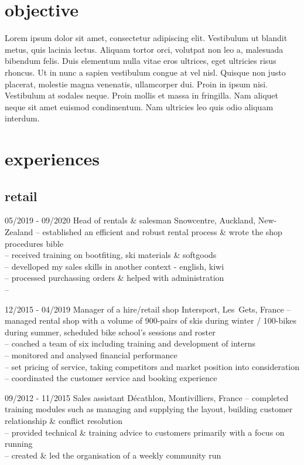 \documentclass[a4paper]{farangoth-cv}
\begin{document}
\section{objective}
Lorem ipsum dolor sit amet, consectetur adipiscing elit. Vestibulum ut blandit metus, quis lacinia lectus. Aliquam tortor orci, volutpat non leo a, malesuada bibendum felis. Duis elementum nulla vitae eros ultrices, eget ultricies risus rhoncus. Ut in nunc a sapien vestibulum congue at vel nisl. Quisque non justo placerat, molestie magna venenatis, ullamcorper dui. Proin in ipsum nisi. Vestibulum at sodales neque. Proin mollis et massa in fringilla. Nam aliquet neque sit amet euismod condimentum. Nam ultricies leo quis odio aliquam interdum.

\section{experiences}
\subsection{retail}
\begin{entrylist}
  \entry%
  {05/2019 \-- 09/2020}
  {Head of rentals \& salesman}
  {Snowcentre, \mbox{Auckland}, \mbox{New-Zealand}}
  {
    \--- established an efficient and robust rental process \& wrote the shop procedures bible\\
    \--- received training on bootfiting, ski materials \& softgoods\\
    \--- develloped my sales skills in another context \-- english, kiwi\\
    \--- processed purchassing orders \& helped with administration\\
    \--- 
  }
  
  \entry%
  {12/2015 \-- 04/2019}
  {Manager of a hire/retail shop}
  {Intersport, \mbox{Les Gets}, \mbox{France}}
  {
    \--- managed rental shop with a volume of 900-pairs of skis during winter / 100-bikes during summer, scheduled bike school's sessions and roster\\
    \--- coached a team of six including training and development of interns\\
    \--- monitored and analysed financial performance\\
    \--- set pricing of service, taking competitors and market position into consideration\\
    \--- coordinated the customer service and booking experience
  }

  \entry%
  {09/2012 \-- 11/2015}
  {Sales assistant}
  {Décathlon, \mbox{Montivilliers}, \mbox{France}}
  {%
    \--- completed training modules such as managing and supplying the layout, building customer relationship \& conflict resolution\\
    \--- provided technical \& training advice to customers primarily with a focus on running\\
    \--- created \& led the organisation of a weekly community run
  }
\end{entrylist}
\end{document}
